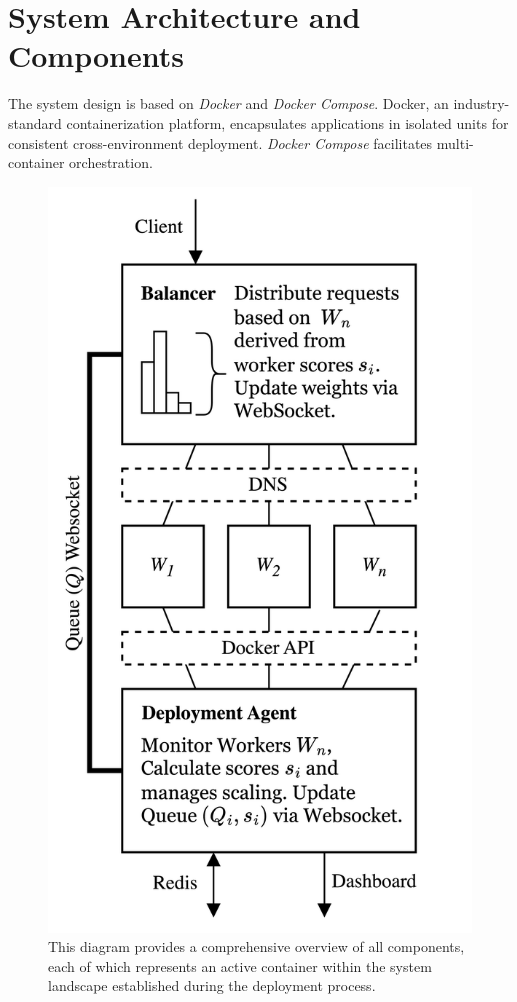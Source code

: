 \documentclass[twocolumn]{webofc}
\begin{document}
    \section{System Architecture and Components}
    The system design is based on \textit{Docker} and \textit{Docker Compose}. Docker, an industry-standard containerization platform, encapsulates applications in isolated units for consistent cross-environment deployment\cite{docker_overview}. \textit{Docker Compose} facilitates multi-container orchestration\cite{docker_compose}.
    \begin{figure}[H]
        \centering
        \includegraphics[width=0.701\columnwidth]{minimaloverview.png}
        \caption{This diagram provides a comprehensive overview of all components, each of which represents an active container within the system landscape established during the deployment process.}
        \label{fig:minimal}
    \end{figure}
\end{document}
